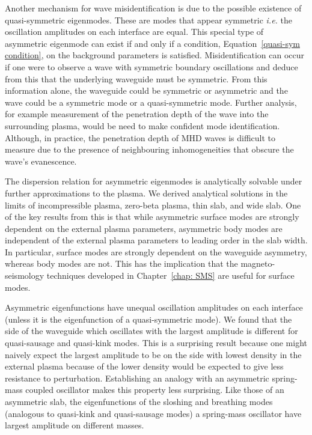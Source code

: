 \documentclass[12pt]{ociamthesis}
\begin{document}
Another mechanism for wave misidentification is due to the possible existence of quasi-symmetric eigenmodes. These are modes that appear symmetric \textit{i.e.} the oscillation amplitudes on each interface are equal. This special type of asymmetric eigenmode can exist if and only if a condition, Equation~\eqref{quasi-sym condition}, on the background parameters is satisfied. Misidentification can occur if one were to observe a wave with symmetric boundary oscillations and deduce from this that the underlying waveguide must be symmetric. From this information alone, the waveguide could be symmetric or asymmetric and the wave could be a symmetric mode or a quasi-symmetric mode. Further analysis, for example measurement of the penetration depth of the wave into the surrounding plasma, would be need to make confident mode identification. Although, in practice, the penetration depth of MHD waves is difficult to measure due to the presence of neighbouring inhomogeneities that obscure the wave's evanescence.

The dispersion relation for asymmetric eigenmodes is analytically solvable under further approximations to the plasma. We derived analytical solutions in the limits of incompressible plasma, zero-beta plasma, thin slab, and wide slab. One of the key results from this is that while asymmetric surface modes are strongly dependent on the external plasma parameters, asymmetric body modes are independent of the external plasma parameters to leading order in the slab width. In particular, surface modes are strongly dependent on the waveguide asymmetry, whereas body modes are not. This has the implication that the magneto-seismology techniques developed in Chapter~\ref{chap: SMS} are useful for surface modes.

Asymmetric eigenfunctions have unequal oscillation amplitudes on each interface (unless it is the eigenfunction of a quasi-symmetric mode). We found that the side of the waveguide which oscillates with the largest amplitude is different for quasi-sausage and quasi-kink modes. This is a surprising result because one might naively expect the largest amplitude to be on the side with lowest density in the external plasma because of the lower density would be expected to give less resistance to perturbation. Establishing an analogy with an asymmetric spring-mass coupled oscillator makes this property less surprising. Like those of an asymmetric slab, the eigenfunctions of the sloshing and breathing modes (analogous to quasi-kink and quasi-sausage modes) a spring-mass oscillator have largest amplitude on different masses.
\end{document}
